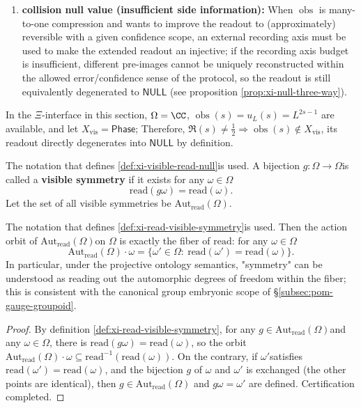 \begin{definition}
\begin{enumerate}
  When \item \textbf{collision null value (insufficient side information):} When \(\operatorname{obs}\) is many-to-one compression and wants to improve the readout to (approximately) reversible with a given confidence scope, an external recording axis must be used to make the extended readout an injective; if the recording axis budget is insufficient, different pre-images cannot be uniquely reconstructed within the allowed error/confidence sense of the protocol, so the readout is still equivalently degenerated to \(\mathsf{NULL}\) (see proposition \ref{prop:xi-null-three-way}).
\end{enumerate}
In the \(\Xi\)-interface in this section, \(\Omega=\CC\), \(\operatorname{obs}(s)=u_L(s)=L^{2s-1}\) are available, and let \(X_{\mathrm{vis}}=\mathsf{Phase}\);
Therefore, \(\Re(s)\neq\tfrac12\Rightarrow \operatorname{obs}(s)\notin X_{\mathrm{vis}}\), its readout directly degenerates into \(\mathsf{NULL}\) by definition.
\end{definition}

\begin{definition}\label{def:xi-read-visible-symmetry}
The notation that defines \ref{def:xi-visible-read-null} ​​is used.
A bijection \(g:\Omega\to\Omega\) ​​is called a \textbf{visible symmetry} if it exists for any \(\omega\in\Omega\)
\[
\mathrm{read}(g\omega)=\mathrm{read}(\omega).
\]
Let the set of all visible symmetries be \(\mathrm{Aut}_{\mathrm{read}}(\Omega)\).
\end{definition}

\begin{proposition}\label{prop:xi-read-fiber-orbits}
The notation that defines \ref{def:xi-read-visible-symmetry} ​​is used.
Then the action orbit of \(\mathrm{Aut}_{\mathrm{read}}(\Omega)\) ​​on \(\Omega\) is exactly the fiber of \(\mathrm{read}\): for any \(\omega\in\Omega\)
\[
\mathrm{Aut}_{\mathrm{read}}(\Omega)\cdot\omega
=\{\omega'\in\Omega:\ \mathrm{read}(\omega')=\mathrm{read}(\omega)\}.
\]
In particular, under the projective ontology semantics, "symmetry" can be understood as reading out the automorphic degrees of freedom within the fiber; this is consistent with the canonical group embryonic scope of \S\ref{subsec:pom-gauge-groupoid}.
\end{proposition}

\begin{proof}
By definition \ref{def:xi-read-visible-symmetry}, for any \(g\in\mathrm{Aut}_{\mathrm{read}}(\Omega)\) ​​and any \(\omega\in\Omega\), there is \(\mathrm{read}(g\omega)=\mathrm{read}(\omega)\), so the orbit \(\mathrm{Aut}_{\mathrm{read}}(\Omega)\cdot\omega\subseteq \mathrm{read}^{-1}(\mathrm{read}(\omega))\).
On the contrary, if \(\omega'\) ​​satisfies \(\mathrm{read}(\omega')=\mathrm{read}(\omega)\), and the bijection \(g\) of \(\omega\) and \(\omega'\) is exchanged (the other points are identical), then \(g\in\mathrm{Aut}_{\mathrm{read}}(\Omega)\) and \(g\omega=\omega'\) are defined.
Certification completed.
\end{proof}

